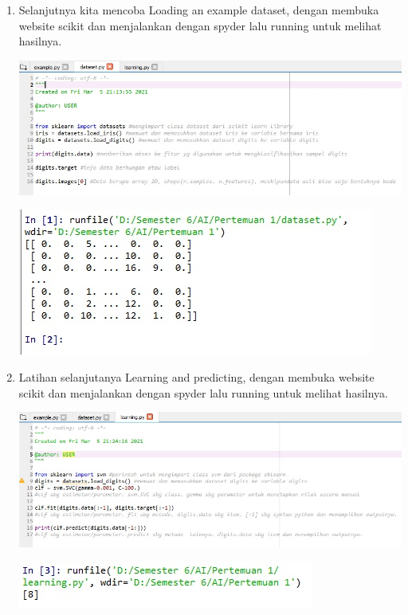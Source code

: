 \begin{enumerate}
    \item Selanjutnya kita mencoba Loading an example dataset, dengan membuka website scikit dan menjalankan dengan spyder lalu running untuk melihat hasilnya.
    \begin{center}
    \includegraphics[scale=0.5]{figures/1184085/chapter1/5.jpg}
    \end{center}
    \begin{center}
    \includegraphics[scale=0.75]{figures/1184085/chapter1/6.jpg}
    \end{center}
    \item Latihan selanjutanya Learning and predicting, dengan membuka website scikit dan menjalankan dengan spyder lalu running untuk melihat hasilnya.
    \begin{center}
    \includegraphics[scale=0.5]{figures/1184085/chapter1/7.jpg}
    \end{center}
    \begin{center}
    \includegraphics[scale=0.75]{figures/1184085/chapter1/8.jpg}

\end{center}
\end{enumerate}
